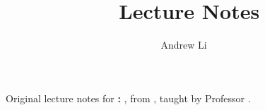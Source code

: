 \documentclass[b5paper]{article}
\numberwithin{algocf}{section}
\numberwithin{equation}{section}
\numberwithin{lemmacounter}{section}
\numberwithin{definitioncounter}{section}
\begin{document}
    
    \pagestyle{fancy}
    \fancyfoot[C]{}
    \fancyfoot[L]{\courseshort \: \coursetitle}
    \fancyfoot[R]{\thepage}

    \title{\textbf{\textsf{\courseshort \, Lecture Notes}}}
    \author{Andrew Li}
    \date{\term}
    \clearpage\maketitle
    \noindent Original lecture notes for \textbf{\courseshort: \coursetitle}, from \term, taught by Professor \prof.
    \thispagestyle{empty}

    \tableofcontents
    
    
    
    
    
    
\end{document}
